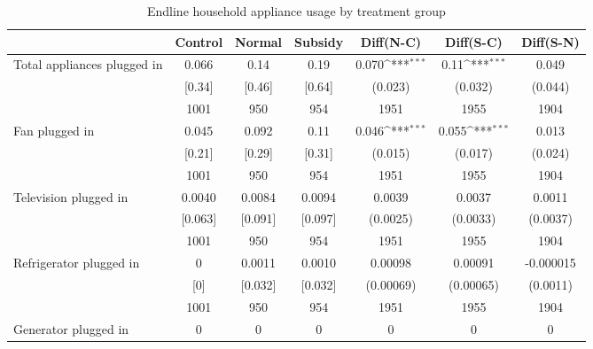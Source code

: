 \begin{table}[htbp]\centering
\def\sym#1{\ifmmode^{#1}\else\(^{#1}\)\fi}
\caption{Endline household appliance usage by treatment group \label{tab:"balance"}}
\begin{tabular*}{1\hsize}{@{\hskip\tabcolsep\extracolsep\fill}l*{1}{cccccc}}
\toprule
                                &  Control&   Normal&  Subsidy&Diff(N-C)         &Diff(S-C)         &Diff(S-N)         \\
\midrule
Total appliances plugged in     &    0.066&     0.14&     0.19&    0.070\sym{***}&     0.11\sym{***}&    0.049         \\
                                &   [0.34]&   [0.46]&   [0.64]&  (0.023)         &  (0.032)         &  (0.044)         \\
                                &     1001&      950&      954&     1951         &     1955         &     1904         \\
Fan plugged in                  &    0.045&    0.092&     0.11&    0.046\sym{***}&    0.055\sym{***}&    0.013         \\
                                &   [0.21]&   [0.29]&   [0.31]&  (0.015)         &  (0.017)         &  (0.024)         \\
                                &     1001&      950&      954&     1951         &     1955         &     1904         \\
Television plugged in           &   0.0040&   0.0084&   0.0094&   0.0039         &   0.0037         &   0.0011         \\
                                &  [0.063]&  [0.091]&  [0.097]& (0.0025)         & (0.0033)         & (0.0037)         \\
                                &     1001&      950&      954&     1951         &     1955         &     1904         \\
Refrigerator plugged in         &        0&   0.0011&   0.0010&  0.00098         &  0.00091         &-0.000015         \\
                                &      [0]&  [0.032]&  [0.032]&(0.00069)         &(0.00065)         & (0.0011)         \\
                                &     1001&      950&      954&     1951         &     1955         &     1904         \\
Generator plugged in            &        0&        0&        0&        0         &        0         &        0         \\

\end{tabular*}
\end{table}
